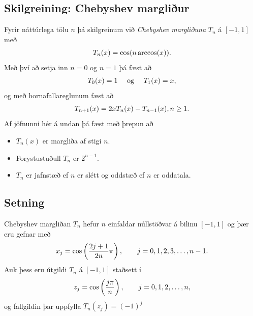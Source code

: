 \documentclass[letterpaper,10pt,icelandic]{sphinxmanual}
\begin{document}
\subsection{Skilgreining: Chebyshev margliður}
\label{kafli03:index-15}\label{kafli03:skilgreining-chebyshev-margliur}
Fyrir náttúrlega tölu \(n\) þá skilgreinum við
\emph{Chebyshev margliðuna} \(T_n\) á \([-1,1]\) með
\begin{gather}
\begin{split}T_n(x) = \cos(n \arccos(x)).\end{split}\notag
\end{gather}
Með því að setja inn \(n=0\) og \(n=1\) þá fæst að
\begin{gather}
\begin{split}T_0(x) = 1 \quad \text{ og } \quad T_1(x) = x,\end{split}\notag
\end{gather}
og með hornafallareglunum fæst að
\begin{gather}
\begin{split}T_{n+1}(x) = 2xT_n(x) - T_{n-1}(x), n \geq 1.\end{split}\notag
\end{gather}
Af jöfnunni hér á undan þá fæst með þrepun að
\begin{itemize}
\item {} 
\(T_n(x)\) er margliða af stigi \(n\).

\item {} 
Forystustuðull \(T_n\) er \(2^{n-1}\).

\item {} 
\(T_n\) er jafnstæð ef \(n\) er slétt og oddstæð ef \(n\)
er oddatala.

\end{itemize}


\subsection{Setning}
\label{kafli03:setning}
Chebyshev margliðan \(T_n\) hefur \(n\) einfaldar
núllstöðvar á bilinu \([-1,1]\) og þær eru gefnar með
\begin{gather}
\begin{split}x_j = \cos\left(\frac{2j+1}{2n}\pi\right),\qquad j=0,1,2,3,\ldots,n-1.\end{split}\notag
\end{gather}
Auk þess eru útgildi \(T_n\) á \([-1,1]\) staðsett í
\begin{gather}
\begin{split}z_j = \cos\left( \frac{j\pi}{n}\right),\qquad j=0,1,2,\ldots,n,\end{split}\notag
\end{gather}
og fallgildin þar uppfylla \(T_n(z_j) = (-1)^j\)
\end{document}
